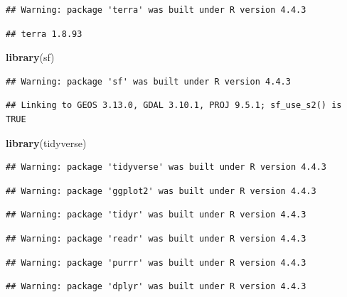 \documentclass[
]{article}
\newenvironment{Shaded}{\begin{snugshade}}{\end{snugshade}}
\newcommand{\FunctionTok}[1]{\textcolor[rgb]{0.13,0.29,0.53}{\textbf{#1}}}
\newcommand{\NormalTok}[1]{#1}
\begin{document}
\begin{verbatim}
## Warning: package 'terra' was built under R version 4.4.3
\end{verbatim}

\begin{verbatim}
## terra 1.8.93
\end{verbatim}

\begin{Shaded}
\begin{Highlighting}[]
\FunctionTok{library}\NormalTok{(sf)}
\end{Highlighting}
\end{Shaded}

\begin{verbatim}
## Warning: package 'sf' was built under R version 4.4.3
\end{verbatim}

\begin{verbatim}
## Linking to GEOS 3.13.0, GDAL 3.10.1, PROJ 9.5.1; sf_use_s2() is TRUE
\end{verbatim}

\begin{Shaded}
\begin{Highlighting}[]
\FunctionTok{library}\NormalTok{(tidyverse)}
\end{Highlighting}
\end{Shaded}

\begin{verbatim}
## Warning: package 'tidyverse' was built under R version 4.4.3
\end{verbatim}

\begin{verbatim}
## Warning: package 'ggplot2' was built under R version 4.4.3
\end{verbatim}

\begin{verbatim}
## Warning: package 'tidyr' was built under R version 4.4.3
\end{verbatim}

\begin{verbatim}
## Warning: package 'readr' was built under R version 4.4.3
\end{verbatim}

\begin{verbatim}
## Warning: package 'purrr' was built under R version 4.4.3
\end{verbatim}

\begin{verbatim}
## Warning: package 'dplyr' was built under R version 4.4.3
\end{verbatim}
\end{document}
